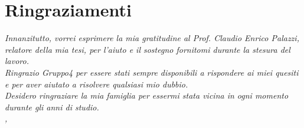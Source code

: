 
\cleardoublepage
{}
{}

\bigskip

\begingroup
\let\clearpage\relax
\let\cleardoublepage\relax
\let\cleardoublepage\relax

\chapter*{Ringraziamenti}

\noindent \textit{Innanzitutto, vorrei esprimere la mia gratitudine al Prof. Claudio Enrico Palazzi, relatore della mia tesi, per l'aiuto e il sostegno fornitomi durante la stesura del lavoro.}\\

\noindent \textit{Ringrazio Gruppo4 per essere stati sempre disponibili a rispondere ai miei quesiti e per aver aiutato a risolvere qualsiasi mio dubbio.}\\

\noindent \textit{Desidero ringraziare la mia famiglia per essermi stata vicina in ogni momento durante gli anni di studio.}\\

\noindent\textit{\myLocation, \myTime}
\hfill \myName

\endgroup

